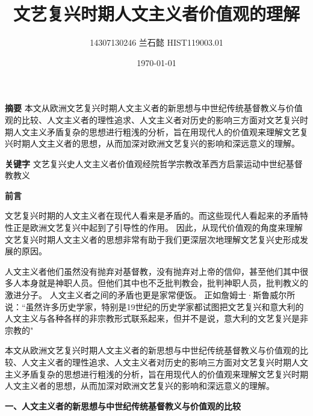 \documentclass[UTF8]{ctexart}
\title{文艺复兴时期人文主义者价值观的理解}
\author{14307130246 兰石懿 HIST119003.01}
\date{\today}
\begin{document}
    \maketitle

    \textbf{摘要}\quad
    本文从欧洲文艺复兴时期人文主义者的新思想与中世纪传统基督教义与价值观的比较、人文主义者的理性追求、人文主义者对历史的影响三方面对文艺复兴时期人文主义矛盾复杂的思想进行粗浅的分析，旨在用现代人的价值观来理解文艺复兴时期人文主义者的思想，从而加深对欧洲文艺复兴的影响和深远意义的理解。

    \textbf{关键字}\quad
     文艺复兴史\quad 人文主义者\quad 价值观\quad 经院哲学\quad 宗教改革\quad 西方启蒙运动\quad 中世纪基督教教义

    \textbf{前言}\par

    文艺复兴时期的人文主义者在现代人看来是矛盾的。而这些现代人看起来的矛盾特性正是欧洲文艺复兴中起到了引导性的作用。
    因此，从现代价值观的角度来理解文艺复兴时期人文主义者的思想非常有助于我们更深层次地理解文艺复兴史形成发展的原因。\par

    人文主义者他们虽然没有抛弃对基督教，没有抛弃对上帝的信仰，甚至他们其中很多人本身就是神职人员。但他们其中也不乏批判教会，批判神职人员，批判教义的激进分子。
    人文主义者之间的矛盾也更是家常便饭。
    正如詹姆士·斯鲁威尔所说：“虽然许多历史学家，特别是19世纪的历史学家都试图把文艺复兴和意大利的人文主义与各种各样的非宗教形式联系起来，但并不是说，意大利的文艺复兴是非宗教的"\footnotemark[1]\par
    本文从欧洲文艺复兴时期人文主义者的新思想与中世纪传统基督教义与价值观的比较、人文主义者的理性追求、人文主义者对历史的影响三方面对文艺复兴时期人文主义矛盾复杂的思想进行粗浅的分析，旨在用现代人的价值观来理解文艺复兴时期人文主义者的思想，从而加深对欧洲文艺复兴的影响和深远意义的理解。



    \textbf{一、人文主义者的新思想与中世纪传统基督教义与价值观的比较}\par
\end{document}

